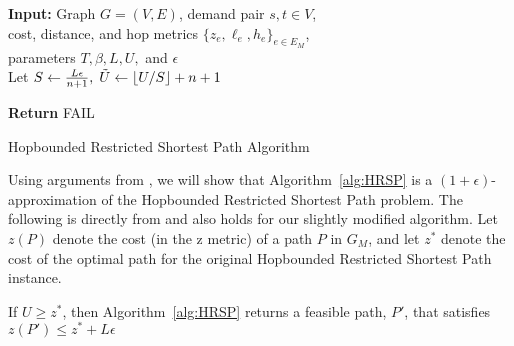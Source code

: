 \begin{algorithm}[ht]
\DontPrintSemicolon

\textbf{Input:} Graph $G = (V, E)$, demand pair $s,t \in V$, \\
cost, distance, and hop metrics $\{z_e, \ell_e, h_e \}_{e \in E_M}$, \\
parameters $T, \beta, L, U,$ and $\epsilon $ \;~\\

Let $S \gets \frac{L \epsilon}{n+1}, \; \Tilde{U} \gets \floor*{U/S} + n + 1$ \\ \; 

 \;

    
 \;

\textbf{Return} FAIL \;

\caption{\label{alg:HRSP} Hopbounded Restricted Shortest Path Algorithm } 
\end{algorithm}
Using arguments from \cite{LR01}, we will show that Algorithm~\ref{alg:HRSP} is a $(1+\epsilon)$-approximation of the Hopbounded Restricted Shortest Path problem.
\else
\fi
\iflong The following is directly from \cite{LR01} and also holds for our slightly modified algorithm. Let $z(P)$ denote the cost (in the $\bm{\mathrm{z}}$ metric) of a path $P$ in $G_M$, and let $z^*$ denote the cost of the optimal path for the original Hopbounded Restricted Shortest Path instance. 

\begin{lemma}
\label{lem:eps_approx}
    If $U \geq z^*$, then Algorithm~\ref{alg:HRSP} returns a feasible path, $P'$, that satisfies $z(P') \leq z^* + L\epsilon$
\end{lemma}

